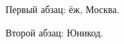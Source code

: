 \documentclass{article}
\begin{document}
Первый абзац: ёж, Москва.

Второй абзац: Юникод.
\end{document}
